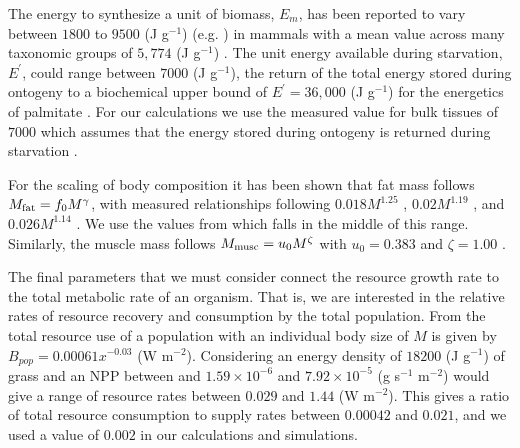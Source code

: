 \documentclass[twocolumn,preprintnumbers,amsmath,amssymb,superscriptaddress]{revtex4}
\begin{document}
The energy to synthesize a unit of biomass, $E_{m}$, has been reported to
vary between $1800$ to $9500$ (J g$^{-1}$)
(e.g. \cite{supp:West:2001bv,supp:moses2008rmo,hou}) in mammals with a mean
value across many taxonomic groups of $5,774$ (J g$^{-1}$)
\cite{supp:moses2008rmo}. The unit energy available during starvation,
$E^{\prime}$, could range between $7000$ (J g$^{-1}$), the return of the
total energy stored during ontogeny \cite{hou} to a biochemical upper bound
of $E^{\prime}=36,000$ (J g$^{-1}$) for the energetics of palmitate
\cite{supp:stryer,supp:hou}. For our calculations we use the measured value
for bulk tissues of $7000$ which assumes that the energy stored during
ontogeny is returned during starvation \cite{supp:hou}.

For the scaling of body composition it has been shown that fat mass follows
$M_{\rm fat}=f_{0}M^{\gamma}$, with measured relationships following
$0.018M^{1.25}$ \cite{supp:Dunbrack:1993ec}, $0.02M^{1.19}$
\cite{supp:Lindstedt:1985hm}, and $0.026M^{1.14}$
\cite{supp:Lindstedt:2002td}. We use the values from
\cite{supp:Lindstedt:1985hm} which falls in the middle of this
range. Similarly, the muscle mass follows $M_{\rm musc}=u_{0}M^{\zeta}$ with
$u_{0}=0.383$ and $\zeta=1.00$ \cite{supp:Lindstedt:2002td}.

The final parameters that we must consider connect the resource growth rate
to the total metabolic rate of an organism. That is, we are interested in the
relative rates of resource recovery and consumption by the total
population. From \cite{supp:allen2002global} the total resource use of a
population with an individual body size of $M$ is given by
$B_{pop}=0.00061x^{-0.03}$ (W m$^{-2}$). Considering an energy density of
$18200$ (J g$^{-1}$) of grass \cite{supp:estermann} and an NPP between and
$1.59\times10^{-6}$ and $7.92\times10^{-5}$ (g s$^{-1}$ m$^{-2}$) would give
a range of resource rates between $0.029$ and $1.44$ (W m$^{-2}$). This gives
a ratio of total resource consumption to supply rates between $0.00042$ and
$0.021$, and we used a value of $0.002$ in our calculations and simulations.


\end{document}
